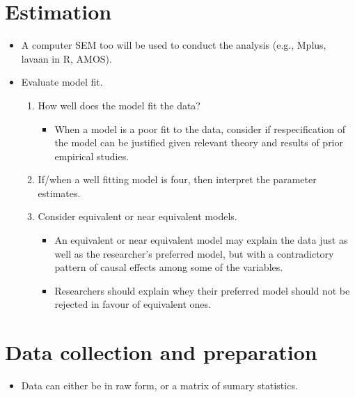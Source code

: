 \documentclass[
]{book}
\providecommand{\tightlist}{%
  \setlength{\itemsep}{0pt}\setlength{\parskip}{0pt}}
\begin{document}
\section{Estimation}\label{estimation}

\begin{itemize}
\item
  A computer SEM too will be used to conduct the analysis (e.g., Mplus, lavaan in R, AMOS).
\item
  Evaluate model fit.

  \begin{enumerate}
  \def\labelenumi{\arabic{enumi}.}
  \tightlist
  \item
    How well does the model fit the data?

    \begin{itemize}
    \tightlist
    \item
      When a model is a poor fit to the data, consider if respecification of the model can be justified given relevant theory and results of prior empirical studies.
    \end{itemize}
  \item
    If/when a well fitting model is four, then interpret the parameter estimates.
  \item
    Consider equivalent or near equivalent models.

    \begin{itemize}
    \tightlist
    \item
      An equivalent or near equivalent model may explain the data just as well as the researcher's preferred model, but with a contradictory pattern of causal effects among some of the variables.
    \item
      Researchers should explain whey their preferred model should not be rejected in favour of equivalent ones.
    \end{itemize}
  \end{enumerate}
\end{itemize}

\section{Data collection and preparation}\label{data-collection-and-preparation}

\begin{itemize}
\tightlist
\item
  Data can either be in raw form, or a matrix of sumary statistics.
\end{itemize}
\end{document}
